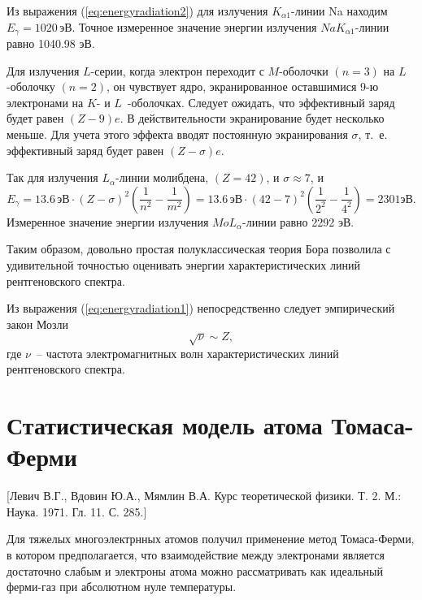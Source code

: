 \documentclass[a4paper,14pt, openany, twoside, draft]{extbook} %
\begin{document}
Из выражения (\ref{eq:energyradiation2}) для излучения $K_{\alpha1}$-линии Na находим $E_{\gamma}=1020\,\text{эВ}$.  Точное измеренное значение энергии излучения $NaK_{\alpha1}$-линии равно 1040.98 эВ.

Для излучения $L$-серии, когда электрон переходит с $M$-оболочки $(n=3)$ на $L$-оболочку $(n=2)$, он чувствует ядро, экранированное оставшимися 9-ю электронами на $K$- и $L$~-оболочках.  Следует ожидать, что эффективный заряд будет равен $(Z-9)e$.  В действительности экранирование будет несколько меньше.  Для учета этого эффекта вводят постоянную экранирования ${\sigma}$, т.~е. эффективный заряд будет равен $(Z-{\sigma})e$.

Так для излучения $L_{\alpha}$-линии молибдена, $(Z=42)$, и $\sigma\approx 7$, и
\begin{equation*}
\label{eq:energyradiation3}
E_{\gamma}=13.6\,{\text{эВ}}\cdot(Z-\sigma)^2(\frac {1}{n^2}-\frac {1}{m^2})=13.6\,{\text{эВ}}\cdot(42-7)^2(\frac {1}{2^2}-\frac {1}{4^2}) = 2301 \text{эВ}.
\end{equation*}
Измеренное значение энергии излучения $MoL_{\alpha}$-линии равно 2292 эВ.

Таким образом, довольно простая полуклассическая теория Бора позволила с удивительной точностью оценивать энергии характеристических линий рентгеновского спектра.

Из выражения (\ref{eq:energyradiation1}) непосредственно следует эмпирический закон Мозли
\begin{equation*}
\sqrt {\nu}\sim Z,
\end{equation*}
где $\nu$~-- частота электромагнитных волн характеристических линий рентгеновского спектра.

\section{Статистическая модель атома Томаса-Ферми}
\label{sec:statmodel}

[Левич В.Г., Вдовин Ю.А., Мямлин В.А. Курс теоретической физики. Т. 2. М.: Наука. 1971. Гл. 11. С. 285.]

Для тяжелых многоэлектрнных атомов получил применение метод Томаса-Ферми, в котором предполагается, что взаимодействие между электронами является достаточно слабым и электроны атома можно рассматривать как идеальный ферми-газ при абсолютном нуле температуры.
\end{document}

